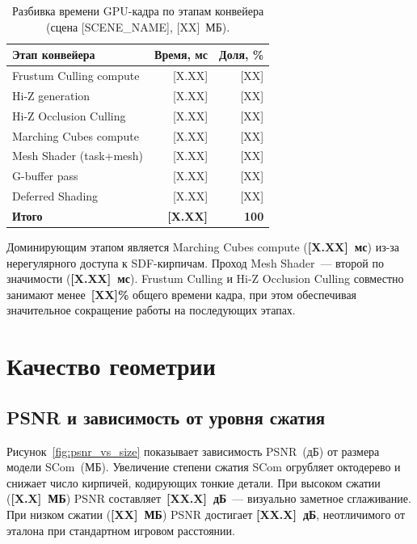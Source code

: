 \begin{table}[h]
  \centering
  \caption{Разбивка времени GPU-кадра по этапам конвейера
    (сцена [SCENE\_NAME], [XX]~МБ).}
  \label{tab:frame_breakdown}
  \begin{tabular}{lrr}
    \toprule
    \textbf{Этап конвейера} & \textbf{Время, мс} & \textbf{Доля, \%} \\
    \midrule
    Frustum Culling compute  & [X.XX] & [XX] \\
    Hi-Z generation          & [X.XX] & [XX] \\
    Hi-Z Occlusion Culling   & [X.XX] & [XX] \\
    Marching Cubes compute   & [X.XX] & [XX] \\
    Mesh Shader (task+mesh)  & [X.XX] & [XX] \\
    G-buffer pass            & [X.XX] & [XX] \\
    Deferred Shading         & [X.XX] & [XX] \\
    \midrule
    \textbf{Итого}           & \textbf{[X.XX]} & \textbf{100} \\
    \bottomrule
  \end{tabular}
\end{table}

Доминирующим этапом является Marching Cubes compute (\textbf{[X.XX]~мс})
из-за нерегулярного доступа к SDF-кирпичам. Проход Mesh Shader~---
второй по значимости (\textbf{[X.XX]~мс}). Frustum Culling и Hi-Z Occlusion
Culling совместно занимают менее~\textbf{[XX]\%} общего времени кадра, при
этом обеспечивая значительное сокращение работы на последующих этапах.

\section{Качество геометрии}
\label{sec:quality}

\subsection{PSNR и зависимость от уровня сжатия}

Рисунок~\ref{fig:psnr_vs_size} показывает зависимость PSNR~(дБ) от размера
модели SCom~(МБ). Увеличение степени сжатия SCom огрубляет октодерево и
снижает число кирпичей, кодирующих тонкие детали. При высоком сжатии
(\textbf{[X.X]~МБ}) PSNR составляет~\textbf{[XX.X]~дБ}~--- визуально
заметное сглаживание. При низком сжатии (\textbf{[XX]~МБ}) PSNR достигает
\textbf{[XX.X]~дБ}, неотличимого от эталона при стандартном игровом
расстоянии.

